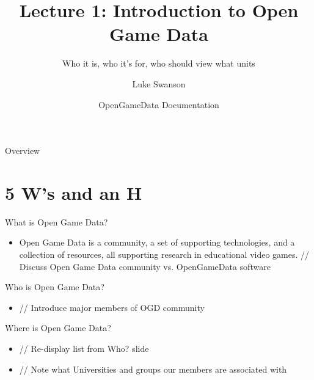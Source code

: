 \documentclass{beamer}
\title[Intro to OGD] %
{Lecture 1: Introduction to Open Game Data}
\subtitle
{Who it is, who it's for, who should view what units} %
\author[Swanson] %
{Luke Swanson}
\institute[University of Wisconsin-Madison] %
{
  Field Day Lab\\
  University of Wisconsin-Madison
}
\date[OGD Docs] %
{OpenGameData Documentation}
\begin{document}
\begin{frame}
  \titlepage
\end{frame}

\begin{frame}{Overview}
  \tableofcontents
\end{frame}




\section[Questions]{5 W's and an H}

\begin{frame}{What is Open Game Data?}
  \begin{itemize}
  \item Open Game Data is a community, a set of supporting technologies, and a collection of resources, all supporting research in educational video games.
    // Discuss Open Game Data community vs. OpenGameData software
    \pause
  \end{itemize}
\end{frame}

\begin{frame}{Who is Open Game Data?}
  \begin{itemize}
  \item
    // Introduce major members of OGD community
    \pause
  \end{itemize}
\end{frame}

\begin{frame}{Where is Open Game Data?}
  \begin{itemize}
    \item // Re-display list from Who? slide
    \pause
    \item // Note what Universities and groups our members are associated with
    \pause
  \end{itemize}
\end{frame}
\end{document}
